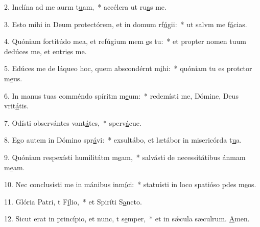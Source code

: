 2. Inclína ad me aurm t\uline{u}am,~* accélera ut ru\uline{a}s me.\par 
3. Esto mihi in Deum protectórem, et in domum rf\uline{ú}gii:~* ut salvm me f\uline{á}cias.\par 
4. Quóniam fortitúdo mea, et refúgium mem \uline{e}s tu:~* et propter nomen tuum dedúces me, et entri\uline{e}s me.\par 
5. Edúces me de láqueo hoc, quem abscondérnt m\uline{i}hi:~* quóniam tu es protctor m\uline{e}us.\par 
6. In manus tuas comméndo spíritm m\uline{e}um:~* redemísti me, Dómine, Deus vrit\uline{á}tis.\par 
7. Odísti observántes vant\uline{á}tes,~* sperv\uline{á}cue.\par 
8. Ego autem in Dómino spr\uline{á}vi:~* exsultábo, et lætábor in misericórda t\uline{u}a.\par 
9. Quóniam respexísti humilitátm m\uline{e}am,~* salvásti de necessitátibus ánmam m\uline{e}am.\par 
10. Nec conclusísti me in mánibus inm\uline{í}ci:~* statuísti in loco spatióso pdes m\uline{e}os.\par 
11. Glória Patri, t F\uline{í}lio,~* et Spiríti S\uline{a}ncto.\par 
12. Sicut erat in princípio, et nunc, t s\uline{e}mper,~* et in sǽcula sæculrum. \uline{A}men.\par 
